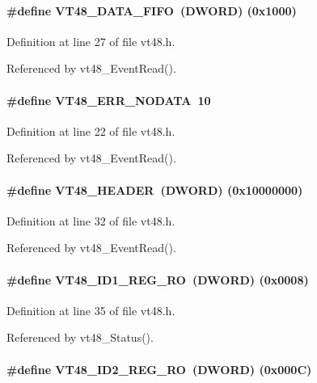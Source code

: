 \paragraph[{VT48\_\-DATA\_\-FIFO}]{\setlength{\rightskip}{0pt plus 5cm}\#define VT48\_\-DATA\_\-FIFO~({\bf DWORD}) (0x1000)}\hfill\label{vt48_8h_a9daae9a6e83ca1d2eae110ed95e99e1d}


Definition at line 27 of file vt48.h.

Referenced by vt48\_\-EventRead().
\paragraph[{VT48\_\-ERR\_\-NODATA}]{\setlength{\rightskip}{0pt plus 5cm}\#define VT48\_\-ERR\_\-NODATA~10}\hfill\label{vt48_8h_a33355fef9a7dbba946edce837388c8a4}


Definition at line 22 of file vt48.h.

Referenced by vt48\_\-EventRead().
\paragraph[{VT48\_\-HEADER}]{\setlength{\rightskip}{0pt plus 5cm}\#define VT48\_\-HEADER~({\bf DWORD}) (0x10000000)}\hfill\label{vt48_8h_ac1b560dd03fdade60b1b3606000046e5}


Definition at line 32 of file vt48.h.

Referenced by vt48\_\-EventRead().
\paragraph[{VT48\_\-ID1\_\-REG\_\-RO}]{\setlength{\rightskip}{0pt plus 5cm}\#define VT48\_\-ID1\_\-REG\_\-RO~({\bf DWORD}) (0x0008)}\hfill\label{vt48_8h_a1ae2773b2350502c90f48cafce1bc13c}


Definition at line 35 of file vt48.h.

Referenced by vt48\_\-Status().
\paragraph[{VT48\_\-ID2\_\-REG\_\-RO}]{\setlength{\rightskip}{0pt plus 5cm}\#define VT48\_\-ID2\_\-REG\_\-RO~({\bf DWORD}) (0x000C)}\hfill\label{vt48_8h_ac06e4c35303c3b92b72691d19202223c}


